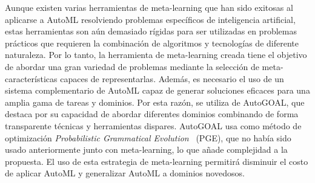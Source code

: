 Aunque existen varias herramientas de meta-learning que han sido exitosas al aplicarse a AutoML resolviendo problemas específicos de inteligencia artificial, estas herramientas son aún demasiado rígidas para ser utilizadas en problemas prácticos que requieren la combinación de algoritmos y tecnologías de diferente naturaleza. Por lo tanto, la herramienta de meta-learning creada tiene el objetivo de abordar una gran variedad de problemas mediante la selección de meta-características capaces de representarlas. Además, es necesario el uso de un sistema complementario de AutoML capaz de generar soluciones eficaces para una amplia gama de tareas y dominios. Por esta razón, se utiliza de AutoGOAL, que destaca por su capacidad de abordar diferentes dominios combinando de forma transparente técnicas y herramientas dispares. AutoGOAL usa como método de optimización \textit{Probabilistic Grammatical Evolution}~\cite{pge2015} (PGE), que no había sido usado anteriormente junto con meta-learning, lo que añade complejidad a la propuesta. El uso de esta estrategia de meta-learning permitirá disminuir el costo de aplicar AutoML y generalizar AutoML a dominios novedosos.

